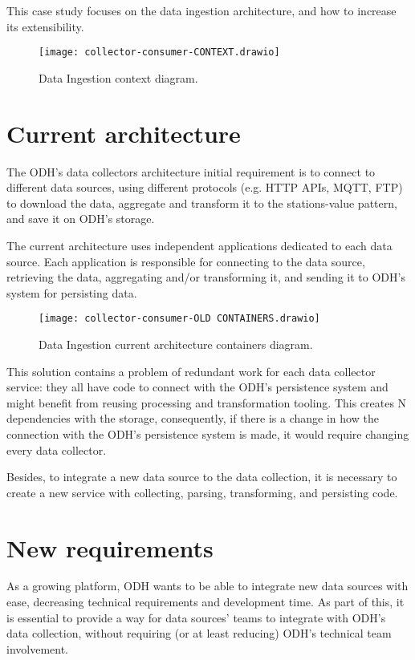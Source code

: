 This case study focuses on the data ingestion architecture, and how to increase its extensibility.

\begin{figure}
    \centering
    \texttt{[image: collector-consumer-CONTEXT.drawio]}
    \caption{Data Ingestion context diagram.\label{fig:subfigures}}
\end{figure}

\section{Current architecture}
\label{sec:current}

The ODH's data collectors architecture initial requirement is to connect to different data sources, using different protocols (e.g. HTTP APIs, MQTT, FTP) to download the data, aggregate and transform it to the stations-value pattern, and save it on ODH’s storage.

The current architecture uses independent applications dedicated to each data source. Each application is responsible for connecting to the data source, retrieving the data, aggregating and/or transforming it, and sending it to ODH's system for persisting data.

\begin{figure}
    \centering
    \texttt{[image: collector-consumer-OLD CONTAINERS.drawio]}
    \caption{Data Ingestion current architecture containers diagram.\label{fig:subfigures}}
\end{figure}

This solution contains a problem of redundant work for each data collector service: they all have code to connect with the ODH's persistence system and might benefit from reusing processing and transformation tooling. This creates N dependencies with the storage, consequently, if there is a change in how the connection with the ODH's persistence system is made, it would require changing every data collector.

Besides, to integrate a new data source to the data collection, it is necessary to create a new service with collecting, parsing, transforming, and persisting code.

\section{New requirements}
\label{sec:requirements}

As a growing platform, ODH wants to be able to integrate new data sources with ease, decreasing technical requirements and development time. As part of this, it is essential to provide a way for data sources' teams to integrate with ODH's data collection, without requiring (or at least reducing) ODH's technical team involvement.

